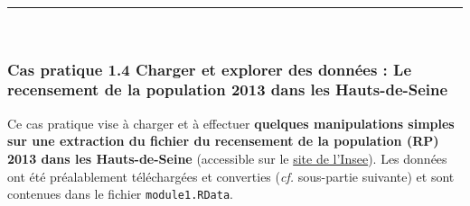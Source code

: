 \documentclass[12pt,twosided, notitlepage]{book}
\begin{document}
\begin{center}\rule{0.5\linewidth}{\linethickness}\end{center}

~

\hypertarget{cas-pratique-1.4-charger-et-explorer-des-donnees-le-recensement-de-la-population-2013-dans-les-hauts-de-seine}{%
\subsubsection{\texorpdfstring{\textbf{Cas pratique 1.4} Charger et
explorer des données : Le recensement de la population 2013 dans les
Hauts-de-Seine}{Cas pratique 1.4 Charger et explorer des données : Le recensement de la population 2013 dans les Hauts-de-Seine}}\label{cas-pratique-1.4-charger-et-explorer-des-donnees-le-recensement-de-la-population-2013-dans-les-hauts-de-seine}}


Ce cas pratique vise à charger et à effectuer \textbf{quelques
manipulations simples sur une extraction du fichier du recensement de la
population (RP) 2013 dans les Hauts-de-Seine} (accessible sur le
\href{https://www.insee.fr/fr/statistiques/2409491}{site de l'Insee}).
Les données ont été préalablement téléchargées et converties (\emph{cf.}
sous-partie suivante) et sont contenues dans le fichier
\texttt{module1.RData}.
\end{document}
